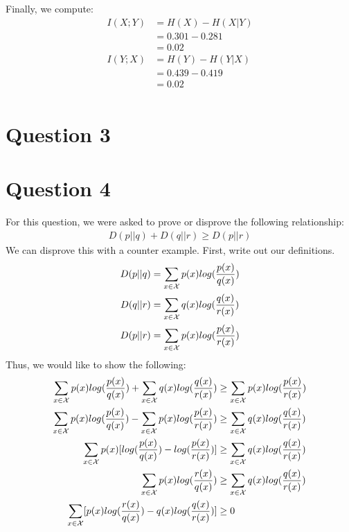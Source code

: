 \documentclass{article}
\begin{document}
Finally, we compute:
\begin{align*}
I(X;Y) &= H(X) - H(X|Y)\\
&= 0.301 - 0.281\\
&= 0.02\\
I(Y;X) &= H(Y) - H(Y|X)\\
&= 0.439 - 0.419\\
&= 0.02\\
\end{align*}
\QED
\newpage

\section{Question 3}

\newpage

\section{Question 4}
For this question, we were asked to prove or disprove the following relationship:
\begin{align*}
D(p||q) + D(q||r) \geq D(p||r)
\end{align*}
We can disprove this with a counter example.  First, write out our definitions.
\begin{align*}
D(p||q) &= \sum_{x \in  \mathcal{X}} p(x) log(\frac{p(x)}{q(x)})\\
D(q||r) &= \sum_{x \in  \mathcal{X}} q(x) log(\frac{q(x)}{r(x)})\\
D(p||r) &= \sum_{x \in  \mathcal{X}} p(x) log(\frac{p(x)}{r(x)})\\
\end{align*}
Thus, we would like to show the following:
\begin{align}
\sum_{x \in  \mathcal{X}} p(x) log(\frac{p(x)}{q(x)}) +  \sum_{x \in  \mathcal{X}} q(x) log(\frac{q(x)}{r(x)}) &\geq  \sum_{x \in  \mathcal{X}} p(x) log(\frac{p(x)}{r(x)})\\
\sum_{x \in  \mathcal{X}} p(x) log(\frac{p(x)}{q(x)}) -  \sum_{x \in  \mathcal{X}} p(x) log(\frac{p(x)}{r(x)}) &\geq \sum_{x \in  \mathcal{X}} q(x) log(\frac{q(x)}{r(x)})\\
\sum_{x \in  \mathcal{X}} p(x) [ log(\frac{p(x)}{q(x)}) - log(\frac{p(x)}{r(x)}) ] &\geq \sum_{x \in  \mathcal{X}} q(x) log(\frac{q(x)}{r(x)})\\
\sum_{x \in  \mathcal{X}} p(x) log(\frac{r(x)}{q(x)}) &\geq \sum_{x \in  \mathcal{X}} q(x) log(\frac{q(x)}{r(x)})\\
\sum_{x \in  \mathcal{X}} [ p(x) log(\frac{r(x)}{q(x)}) - q(x) log(\frac{q(x)}{r(x)}) ] &\geq 0
\end{align}
\end{document}
